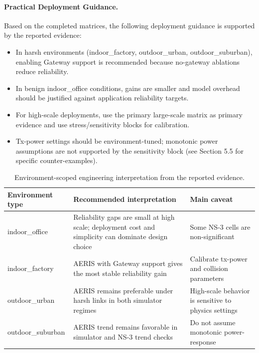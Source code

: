 ﻿\documentclass[sensors,article,submit,moreauthors,pdftex]{Definitions/mdpi}
\begin{document}
\paragraph{Practical Deployment Guidance.}
Based on the completed matrices, the following deployment guidance is supported by the reported evidence:
\begin{itemize}
\item In harsh environments (indoor\_factory, outdoor\_urban, outdoor\_suburban), enabling Gateway support is recommended because no-gateway ablations reduce reliability.
\item In benign indoor\_office conditions, gains are smaller and model overhead should be justified against application reliability targets.
\item For high-scale deployments, use the primary large-scale matrix as primary evidence and use stress/sensitivity blocks for calibration.
\item Tx-power settings should be environment-tuned; monotonic power assumptions are not supported by the sensitivity block (see Section 5.5 for specific counter-examples).
\end{itemize}

\begin{table}[H]
\caption{Environment-scoped engineering interpretation from the reported evidence.}
\label{tab:deployment_summary}
\centering
\small
\begin{tabular}{>{\raggedright\arraybackslash}p{} >{\raggedright\arraybackslash}p{} >{\raggedright\arraybackslash}p{}}
\toprule
Environment type & Recommended interpretation & Main caveat \\
\midrule
indoor\_office & Reliability gaps are small at high scale; deployment cost and simplicity can dominate design choice & Some NS-3 cells are non-significant \\
indoor\_factory & AERIS with Gateway support gives the most stable reliability gain & Calibrate tx-power and collision parameters \\
outdoor\_urban & AERIS remains preferable under harsh links in both simulator regimes & High-scale behavior is sensitive to physics settings \\
outdoor\_suburban & AERIS trend remains favorable in simulator and NS-3 trend checks & Do not assume monotonic power-response \\
\bottomrule
\end{tabular}
\normalsize
\end{table}
\end{document}
